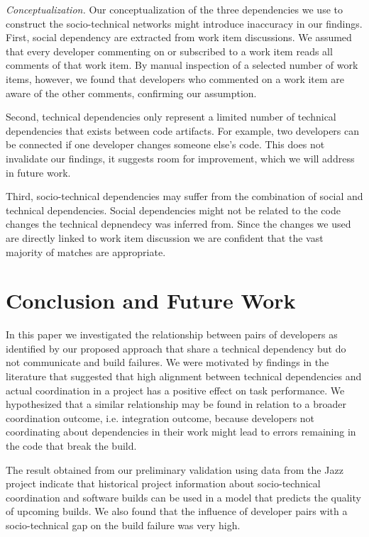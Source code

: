 \documentclass[conference]{IEEEtran}
\begin{document}
\emph{Conceptualization.}
Our conceptualization of the three dependencies we use to construct the socio-technical networks might introduce inaccuracy in our findings.
First, social dependency are extracted from work item discussions. 
We assumed that every developer commenting on or subscribed to a work item reads all comments of that work item. 
By manual inspection of a selected number of work items, however, we found that developers who commented on a work item are aware of the other comments, confirming our assumption.

Second, technical dependencies only represent a limited number of technical dependencies that exists between code artifacts. 
For example, two developers can be connected if one developer changes someone else's code. 
This does not invalidate our findings, it suggests room for improvement, which we will address in future work.

Third, socio-technical dependencies may suffer from the combination of social and technical dependencies. 
Social dependencies might not be related to the code changes the technical depnendecy was inferred from.
Since the changes we used are directly linked to work item discussion we are confident that the vast majority of matches are appropriate.


\section{Conclusion and Future Work}
In this paper we investigated the relationship between pairs of developers as identified by our proposed approach that share
a technical dependency but do not communicate and build failures. We were
motivated by findings in the literature that suggested that high alignment between technical dependencies and actual coordination in a project has a positive effect on task
performance.
We hypothesized that a similar relationship may be found in relation to a broader
coordination outcome, i.e. integration outcome, because developers not
coordinating about dependencies in their work might lead to errors remaining in
the code that break the build.

The result obtained from our preliminary validation using data from the Jazz project indicate that 
historical project information about socio-technical coordination and software
builds can be used in a model that predicts the quality of upcoming builds. We also found
that the influence of developer pairs with a socio-technical gap on the build
failure was very high. 
\end{document}

